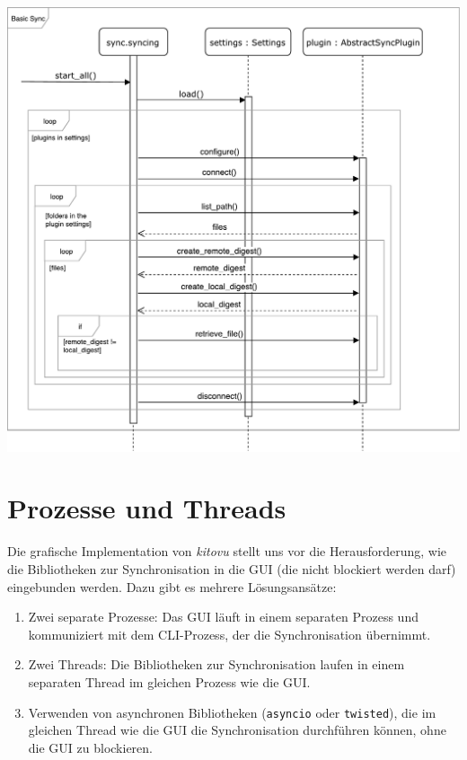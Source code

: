 \documentclass[a4paper]{article}
\let\oldsection\section
\renewcommand\section{\clearpage\oldsection}
\begin{document}
\includegraphics[width=40em]{./img/GrobesSequenzDiagramm.pdf}

\section{Prozesse und Threads}


Die grafische Implementation von \emph{kitovu} stellt uns vor die Herausforderung, wie die Bibliotheken zur Synchronisation in die GUI (die nicht blockiert werden darf) eingebunden werden. Dazu gibt es mehrere Lösungsansätze:

\begin{enumerate}
	\item Zwei separate Prozesse: Das GUI läuft in einem separaten Prozess und kommuniziert mit dem CLI-Prozess, der die Synchronisation übernimmt.
	\item Zwei Threads: Die Bibliotheken zur Synchronisation laufen in einem separaten Thread im gleichen Prozess wie die GUI.
	\item Verwenden von asynchronen Bibliotheken (\verb|asyncio| oder \verb|twisted|), die im gleichen Thread wie die GUI die Synchronisation durchführen können, ohne die GUI zu blockieren.
\end{enumerate}
\end{document}

